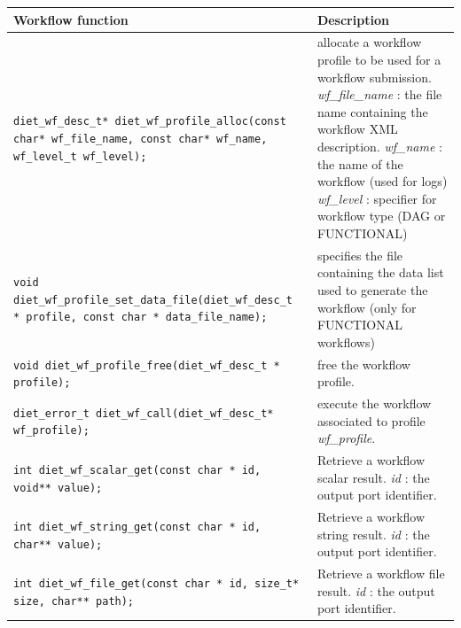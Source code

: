 \begin{table}[htbp]
  \centering
  \begin{tabular}[htbp]{|p{8cm}|p{7.5cm}|}\hline
    Workflow function & Description \\\hline
    \texttt{diet\_wf\_desc\_t*  \newline
      diet\_wf\_profile\_alloc(const char* wf\_file\_name, const char* wf\_name, wf\_level\_t wf\_level);}
    &
    allocate a workflow profile to be used for a workflow submission.\newline
    \textit{wf\_file\_name} : the file name containing the workflow XML description.
    \textit{wf\_name} : the name of the workflow (used for logs)
    \textit{wf\_level} : specifier for workflow type (DAG or FUNCTIONAL)
    \\\hline
    \texttt{void  \newline
      diet\_wf\_profile\_set\_data\_file(diet\_wf\_desc\_t * profile, const char * data\_file\_name);}
    &
    specifies the file containing the data list used to generate the workflow (only for FUNCTIONAL workflows)
    \\\hline
    \texttt{void  \newline
      diet\_wf\_profile\_free(diet\_wf\_desc\_t * profile);}
    &
    free the workflow profile.
    \\\hline
    \texttt{diet\_error\_t \newline
      diet\_wf\_call(diet\_wf\_desc\_t* wf\_profile);}
    &
    execute the workflow associated to profile \textit{wf\_profile}.
    \\\hline
    \texttt{int   \newline
      diet\_wf\_scalar\_get(const char * id, void** value);}
    &
    Retrieve a workflow scalar result. \newline
    \textit{id} : the output port identifier.
    \\\hline
    \texttt{int   \newline
      diet\_wf\_string\_get(const char * id, char** value);}
    &
    Retrieve a workflow string result. \newline
    \textit{id} : the output port identifier.
    \\\hline
    \texttt{int    \newline
      diet\_wf\_file\_get(const char * id, size\_t* size, char** path);
    }
    &
    Retrieve a workflow file result. \newline
    \textit{id} : the output port identifier.

\end{tabular}
\end{table}
